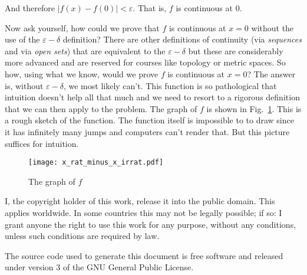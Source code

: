 \documentclass{article}
\theoremstyle{normal}
\begin{document}
    And therefore $|f(x)-f(0)|<\varepsilon$. That is, $f$ is continuous at 0.
    \par\hfill\par
    Now ask yourself, how could we prove that $f$ is continuous at $x=0$
    without the use of the $\varepsilon-\delta$ definition? There are other
    definitions of continuity (via \textit{sequences} and via
    \textit{open sets}) that are equivalent to the $\varepsilon-\delta$ but
    these are considerably more advanced and are reserved for courses like
    topology or metric spaces. So how, using what we know, would we
    prove $f$ is continuous at $x=0$? The answer is, without
    $\varepsilon-\delta$, we most likely can't. This function is so pathological
    that intuition doesn't help all that much and we need to resort to a
    rigorous definition that we can then apply to the problem. The graph
    of $f$ is shown in Fig.~\ref{fig:graph_of_f}. This is a rough sketch of
    the function. The function itself is impossible to to draw since it has
    infinitely many jumps and computers can't render that. But this picture
    suffices for intuition.
    \begin{figure}
        \centering
        \texttt{[image: x\_rat\_minus\_x\_irrat.pdf]}
        \caption{The graph of $f$}
        \label{fig:graph_of_f}
    \end{figure}
    \newpage
    I, the copyright holder of this work, release it into the public domain.
    This applies worldwide. In some countries this may not be legally possible;
    if so: I grant anyone the right to use this work for any purpose, without
    any conditions, unless such conditions are required by law.
    \par\hfill\par
    The source code used to generate this document is free software and released
    under version 3 of the GNU General Public License.
\end{document}
